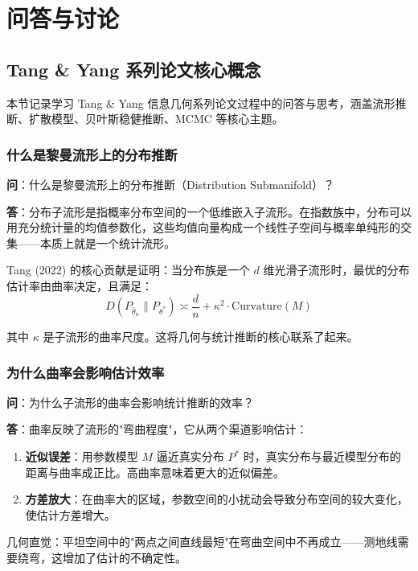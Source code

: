 \appendix
\chapter{问答与讨论}

\section{Tang \& Yang 系列论文核心概念}

本节记录学习 Tang \& Yang 信息几何系列论文过程中的问答与思考，涵盖流形推断、扩散模型、贝叶斯稳健推断、MCMC 等核心主题。

\subsection{什么是黎曼流形上的分布推断}\label{sec:qa-rimfd}

\textbf{问}：什么是黎曼流形上的分布推断（Distribution Submanifold）？

\textbf{答}：分布子流形是指概率分布空间的一个低维嵌入子流形。在指数族中，分布可以用充分统计量的均值参数化，这些均值向量构成一个线性子空间与概率单纯形的交集——本质上就是一个统计流形。

Tang (2022) 的核心贡献是证明：当分布族是一个 $d$ 维光滑子流形时，最优的分布估计率由曲率决定，且满足：
$$D(P_{\hat{\theta}_n} \| P_{\theta^*}) \asymp \frac{d}{n} + \kappa^2 \cdot \text{Curvature}(M)$$

其中 $\kappa$ 是子流形的曲率尺度。这将几何与统计推断的核心联系了起来。

\subsection{为什么曲率会影响估计效率}\label{sec:qa-curvature-efficiency}

\textbf{问}：为什么子流形的曲率会影响统计推断的效率？

\textbf{答}：曲率反映了流形的"弯曲程度"，它从两个渠道影响估计：

\begin{enumerate}
    \item \textbf{近似误差}：用参数模型 $M$ 逼近真实分布 $P^*$ 时，真实分布与最近模型分布的距离与曲率成正比。高曲率意味着更大的近似偏差。
    \item \textbf{方差放大}：在曲率大的区域，参数空间的小扰动会导致分布空间的较大变化，使估计方差增大。
\end{enumerate}

几何直觉：平坦空间中的"两点之间直线最短"在弯曲空间中不再成立——测地线需要绕弯，这增加了估计的不确定性。

